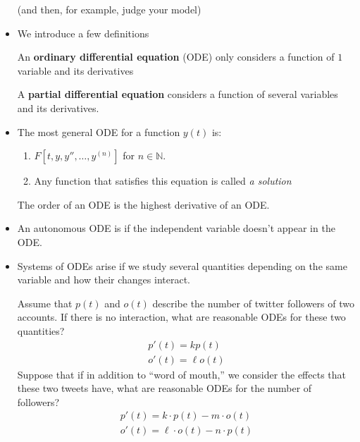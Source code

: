\begin{itemize}
\begin{idea}
              (and then, for example, judge your model)
          \end{idea}
    \item We introduce a few definitions
          \begin{definition}
              An \textbf{ordinary differential equation} (ODE) only considers a function of $1$ variable and its derivatives
          \end{definition}
          \begin{definition}
              A \textbf{partial differential equation} considers a function of several variables and its derivatives.
          \end{definition}
    \item The most general ODE for a function $y(t)$ is:
          \begin{enumerate}[label=(\alph*)]
              \item $F[t,y,y'',\dots,y^{(n)}]$ for $n\in \mathbb{N}$.
              \item Any function that satisfies this equation is called \textit{a solution}
          \end{enumerate}
          \begin{definition}
              The order of an ODE is the highest derivative of an ODE.
          \end{definition}
    \item An autonomous ODE is if the independent variable doesn't appear in the ODE.
    \item Systems of ODEs arise if we study several quantities depending on the same variable and how their changes interact.
          \begin{example}
              Assume that $p(t)$ and $o(t)$ describe the number of twitter followers of two accounts. If there is no interaction, what are reasonable ODEs for these two quantities?
              \begin{align}
                  p'(t) = kp(t) \\
                  o'(t) = \ell o(t)
              \end{align}
              Suppose that if in addition to ``word of mouth,'' we consider the effects that these two tweets have, what are reasonable ODEs for the number of followers?
              \begin{align}
                  p'(t) = k \cdot p(t) - m \cdot o(t) \\
                  o'(t) = \ell \cdot o(t) - n \cdot p(t)
              \end{align}

\end{example}
\end{itemize}
